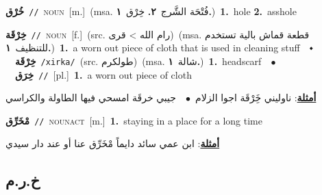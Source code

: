 \documentclass[10pt,a4paper,twoside]{article} %
\begin{document}
\begin{multicols}{2}
{\setlength\topsep{0pt}\textbf{\foreignlanguage{arabic}{خُرْق}}\ {\color{gray}\texttt{//}\color{black}}\ \textsc{noun}\ [m.]\ \color{gray}(msa. \foreignlanguage{arabic}{فُتْحَة الشَّرج}~\foreignlanguage{arabic}{\textbf{٢.}}  \foreignlanguage{arabic}{خِرْق}~\foreignlanguage{arabic}{\textbf{١.}})\color{black}\ \textbf{1.}~hole  \textbf{2.}~asshole\ } \vspace{2mm}

{\setlength\topsep{0pt}\textbf{\foreignlanguage{arabic}{خِرْقَة}}\ {\color{gray}\texttt{//}\color{black}}\ \textsc{noun}\ [f.]\ (src. \color{gray}\foreignlanguage{arabic}{رام الله > قرى}\color{black})\ \color{gray}(msa. \foreignlanguage{arabic}{قطعة قماش بالية تستخدم للتنظيف}~\foreignlanguage{arabic}{\textbf{١.}})\color{black}\ \textbf{1.}~a worn out piece of cloth that is used in cleaning stuff\ \ $\smblkdiamond$\ \ \setlength\topsep{0pt}\textbf{\foreignlanguage{arabic}{خِرْقَة}}\ {\color{gray}\texttt{/xirka/}\color{black}}\ (src. \color{gray}\foreignlanguage{arabic}{طولكرم}\color{black})\ \color{gray}(msa. \foreignlanguage{arabic}{شالة}~\foreignlanguage{arabic}{\textbf{١.}})\color{black}\ \textbf{1.}~headscarf\ \ $\bullet$\ \ \setlength\topsep{0pt}\textbf{\foreignlanguage{arabic}{خِرَق}}\ {\color{gray}\texttt{//}\color{black}}\ [pl.]\ \textbf{1.}~a worn out piece of cloth\  \begin{flushright}\color{gray}\foreignlanguage{arabic}{\textbf{\underline{\foreignlanguage{arabic}{أمثلة}}}: ناوليني خَِرْقَة اجوا الزلام\ $\bullet$\ \  جيبي خرقَة امسحي فيها الطاولة والكراسي}\end{flushright}\color{black}} \vspace{2mm}

{\setlength\topsep{0pt}\textbf{\foreignlanguage{arabic}{مْخَرِّق}}\ {\color{gray}\texttt{//}\color{black}}\ \textsc{noun\textunderscore act}\ [m.]\ \textbf{1.}~staying in a place for a long time\  \begin{flushright}\color{gray}\foreignlanguage{arabic}{\textbf{\underline{\foreignlanguage{arabic}{أمثلة}}}: ابن عمي سائد دايماً مْخَرِّق عنا أو عند دار سيدي}\end{flushright}\color{black}} \vspace{2mm}

\vspace{-3mm}
\subsection*{\color{blue}\foreignlanguage{arabic}{خ.ر.م}\color{blue}{}} 


\end{multicols}
\end{document}
